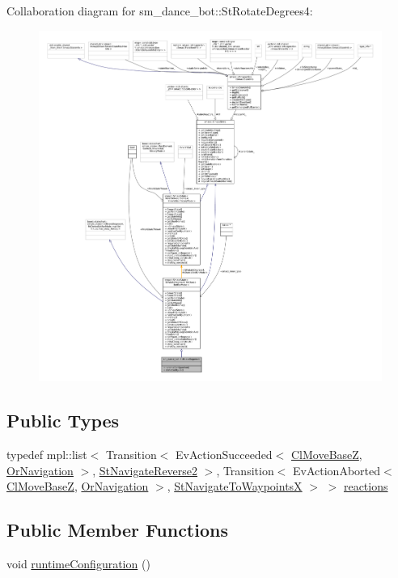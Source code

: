 Collaboration diagram for sm\+\_\+dance\+\_\+bot\+:\+:St\+Rotate\+Degrees4\+:
\nopagebreak
\begin{figure}[H]
\begin{center}
\leavevmode
\includegraphics[width=350pt]{structsm__dance__bot_1_1StRotateDegrees4__coll__graph}
\end{center}
\end{figure}
\subsection*{Public Types}
\begin{DoxyCompactItemize}
\item 
typedef mpl\+::list$<$ Transition$<$ Ev\+Action\+Succeeded$<$ \hyperlink{classmove__base__z__client_1_1ClMoveBaseZ}{Cl\+Move\+BaseZ}, \hyperlink{classsm__dance__bot_1_1OrNavigation}{Or\+Navigation} $>$, \hyperlink{structsm__dance__bot_1_1StNavigateReverse2}{St\+Navigate\+Reverse2} $>$, Transition$<$ Ev\+Action\+Aborted$<$ \hyperlink{classmove__base__z__client_1_1ClMoveBaseZ}{Cl\+Move\+BaseZ}, \hyperlink{classsm__dance__bot_1_1OrNavigation}{Or\+Navigation} $>$, \hyperlink{structsm__dance__bot_1_1StNavigateToWaypointsX}{St\+Navigate\+To\+WaypointsX} $>$ $>$ \hyperlink{structsm__dance__bot_1_1StRotateDegrees4_a4850f13da169b79792836fa0319d0659}{reactions}
\end{DoxyCompactItemize}
\subsection*{Public Member Functions}
\begin{DoxyCompactItemize}
\item 
void \hyperlink{structsm__dance__bot_1_1StRotateDegrees4_a3e9efe961aaa0b6adac56bfa2142896f}{runtime\+Configuration} ()
\end{DoxyCompactItemize}
